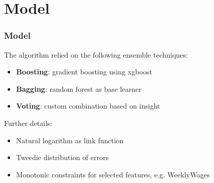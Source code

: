 \documentclass{beamer}
\begin{document}

\section{Model}
\begin{frame}
\frametitle{Model}
The algorithm relied on the following ensemble techniques:
\begin{itemize}
	\item \textbf{Boosting}: gradient boosting using xgboost
	\item \textbf{Bagging}: random forest as base learner
	\item \textbf{Voting}: custom combination based on insight
\end{itemize}
Further details:
\begin{itemize}
	\item Natural logarithm as link function
	\item Tweedie distribution of errors
	\item Monotonic constraints for selected features, e.g. WeeklyWages
\end{itemize}
\end{frame}
\end{document}
